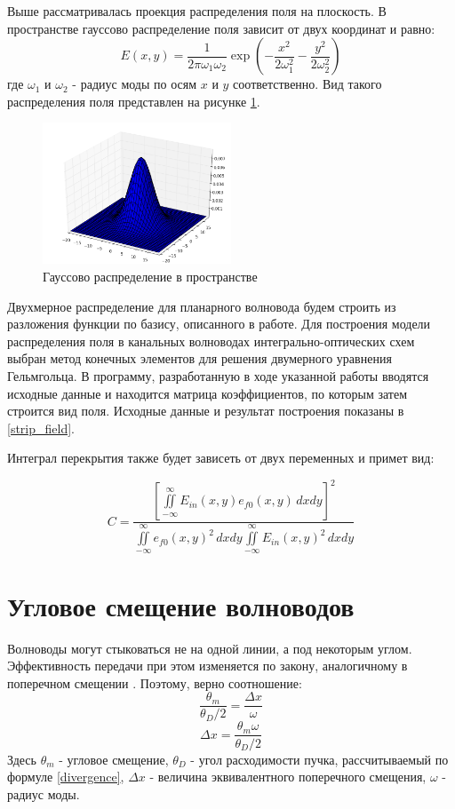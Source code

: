 Выше рассматривалась проекция распределения поля на плоскость. В пространстве гауссово распределение поля зависит от двух координат и равно:
\begin{equation}
  \label{gauss3d}
  E(x,y)=\frac{1}{2\pi\omega_1\omega_2}\exp\left(-\frac{x^2}{2\omega_1^2}-\frac{y^2}{2\omega_2^2}\right)
\end{equation}
где $\omega_1$ и $\omega_2$ - радиус моды по осям $x$ и $y$ соответственно. Вид такого распределения поля представлен на рисунке \ref{gauss3dPlot}.
\begin{figure}[h!]
	\includegraphics[width=0.5\textwidth]{img/gauss3d.png}
	\caption{Гауссово распределение в пространстве}
	\label{gauss3dPlot}
\end{figure}

Двухмерное распределение для планарного волновода будем строить из разложения функции по базису, описанного в работе\cite{vlada}. Для построения модели распределения поля в канальных волноводах интегрально-оптических схем выбран метод конечных элементов для решения двумерного уравнения Гельмгольца. В программу, разработанную в ходе указанной работы вводятся исходные данные и находится матрица коэффициентов, по которым затем строится вид поля. Исходные данные и результат построения показаны в \ref{strip_field}.

Интеграл перекрытия также будет зависеть от двух переменных и примет вид:

\begin{equation}
	\label{coupling_2d}
	C = \frac{\left[\iint\limits_{-\infty}^{\infty}E_{in}(x,y)e_{f0}(x,y) \,dxdy\right]^2}
	{\iint\limits_{-\infty}^{\infty}e_{f0}(x,y)^2 \,dxdy
	 \iint\limits_{-\infty}^{\infty}E_{in}(x,y)^2 \,dxdy}
\end{equation}

\section{Угловое смещение волноводов}
\label{angular_movement}
Волноводы могут стыковаться не на одной линии, а под некоторым углом. Эффективность передачи при этом изменяется по закону, аналогичному в поперечном смещении \cite{lefevre}. Поэтому, верно соотношение:
\begin{equation}
	\frac{\theta_m}{\theta_D/2}	= \frac{\Delta x}{\omega}
\end{equation}
\begin{equation}
	\Delta x = \frac{\theta_m \omega}{\theta_D/2}
	\label{transverse_analog}
\end{equation}
Здесь $\theta_m$ - угловое смещение, $\theta_D$ - угол расходимости пучка, рассчитываемый по формуле \ref{divergence}, $\Delta x$ - величина эквивалентного поперечного смещения, $\omega$ - радиус моды. 

